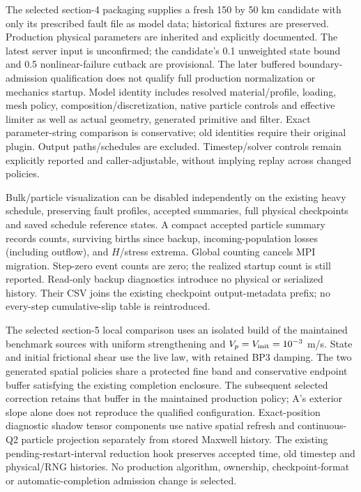 \documentclass[11pt]{article}
\begin{document}
The selected section-4 packaging supplies a fresh 150 by 50 km candidate with
only its prescribed fault file as model data; historical fixtures are preserved.
Production physical parameters are inherited and explicitly documented. The latest
server input is unconfirmed; the candidate's 0.1 unweighted state bound and 0.5
nonlinear-failure cutback are provisional. The later buffered boundary-admission
qualification does not qualify full production normalization or mechanics startup.
Model identity includes resolved material/profile, loading, mesh policy,
composition/discretization, native particle controls and effective limiter as well
as actual geometry, generated primitive and filter. Exact parameter-string
comparison is conservative; old identities require their original plugin.
Output paths/schedules are excluded. Timestep/solver controls remain explicitly
reported and caller-adjustable, without implying replay across changed policies.

Bulk/particle visualization can be disabled independently on the existing heavy
schedule, preserving fault profiles, accepted summaries, full physical checkpoints
and saved schedule reference states. A compact accepted particle summary records
counts, surviving births since backup, incoming-population losses (including
outflow), and $H$/stress extrema. Global counting cancels MPI migration. Step-zero
event counts are zero; the realized startup count is still reported. Read-only
backup diagnostics introduce no physical or serialized history. Their CSV joins
the existing checkpoint output-metadata prefix; no every-step cumulative-slip
table is reintroduced.

The selected section-5 local comparison uses an isolated build of the maintained
benchmark sources with uniform strengthening and $V_p=V_{\rm init}=10^{-3}$ m/s.
State and initial frictional shear use the live law, with retained BP3 damping.
The two generated spatial policies share a protected fine band and conservative
endpoint buffer satisfying the existing completion enclosure. The subsequent
selected correction retains that buffer in the maintained production policy;
A's exterior slope alone does not reproduce the qualified configuration.
Exact-position diagnostic shadow tensor components use native spatial refresh
and continuous-Q2 particle projection separately from stored Maxwell history.
The existing pending-restart-interval reduction hook preserves accepted time,
old timestep and physical/RNG histories. No production algorithm, ownership,
checkpoint-format or automatic-completion admission change is selected.
\end{document}
